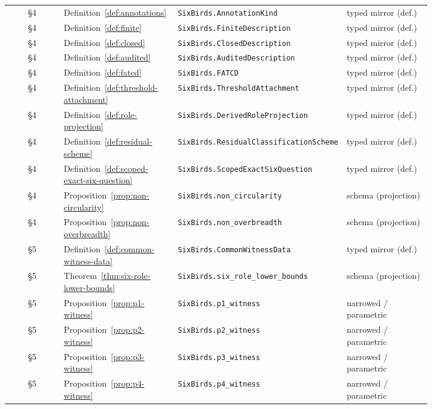\documentclass[11pt]{article}
\theoremstyle{definition}
\begin{document}
{\begin{longtable}{@{}c >{\raggedright\arraybackslash}p{0.27\linewidth} >{\raggedright\arraybackslash}p{0.34\linewidth} >{\raggedright\arraybackslash}p{0.20\linewidth}@{}}
§4 & Definition~\ref{def:annotations} & \texttt{SixBirds.\allowbreak AnnotationKind} & typed mirror (def.) \\
§4 & Definition~\ref{def:finite} & \texttt{SixBirds.\allowbreak FiniteDescription} & typed mirror (def.) \\
§4 & Definition~\ref{def:closed} & \texttt{SixBirds.\allowbreak ClosedDescription} & typed mirror (def.) \\
§4 & Definition~\ref{def:audited} & \texttt{SixBirds.\allowbreak AuditedDescription} & typed mirror (def.) \\
§4 & Definition~\ref{def:fatcd} & \texttt{SixBirds.\allowbreak FATCD} & typed mirror (def.) \\
§4 & Definition~\ref{def:threshold-attachment} & \texttt{SixBirds.\allowbreak ThresholdAttachment} & typed mirror (def.) \\
§4 & Definition~\ref{def:role-projection} & \texttt{SixBirds.\allowbreak DerivedRoleProjection} & typed mirror (def.) \\
§4 & Definition~\ref{def:residual-scheme} & \texttt{SixBirds.\allowbreak ResidualClassificationScheme} & typed mirror (def.) \\
§4 & Definition~\ref{def:scoped-exact-six-question} & \texttt{SixBirds.\allowbreak ScopedExactSixQuestion} & typed mirror (def.) \\
§4 & Proposition~\ref{prop:non-circularity} & \texttt{SixBirds.\allowbreak non\_\allowbreak circularity} & schema (projection) \\
§4 & Proposition~\ref{prop:non-overbreadth} & \texttt{SixBirds.\allowbreak non\_\allowbreak overbreadth} & schema (projection) \\
§5 & Definition~\ref{def:common-witness-data} & \texttt{SixBirds.\allowbreak CommonWitnessData} & typed mirror (def.) \\
§5 & Theorem~\ref{thm:six-role-lower-bounds} & \texttt{SixBirds.\allowbreak six\_\allowbreak role\_\allowbreak lower\_\allowbreak bounds} & schema (projection) \\
§5 & Proposition~\ref{prop:p1-witness} & \texttt{SixBirds.\allowbreak p1\_\allowbreak witness} & narrowed / parametric \\
§5 & Proposition~\ref{prop:p2-witness} & \texttt{SixBirds.\allowbreak p2\_\allowbreak witness} & narrowed / parametric \\
§5 & Proposition~\ref{prop:p3-witness} & \texttt{SixBirds.\allowbreak p3\_\allowbreak witness} & narrowed / parametric \\
§5 & Proposition~\ref{prop:p4-witness} & \texttt{SixBirds.\allowbreak p4\_\allowbreak witness} & narrowed / parametric \\

\end{longtable}}
\end{document}
